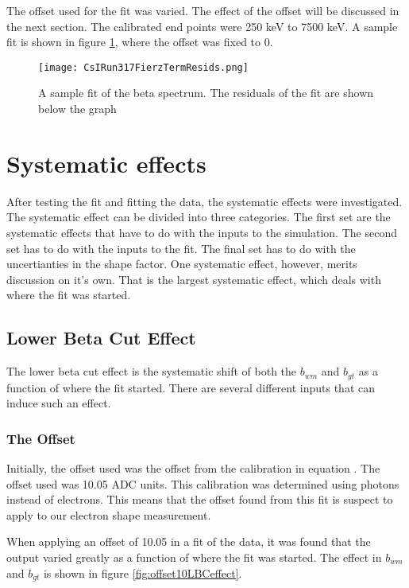 \documentclass[main.tex]{subfiles}
\begin{document}
The offset used for the fit was varied.
The effect of the offset will be discussed in the next section. 
The calibrated end points were 250 keV to 7500 keV. 
A sample fit is shown in figure \ref{fig:samplefit}, where the offset was fixed to 0.

\begin{figure}[!htb]
	\centerline{\texttt{[image: CsIRun317FierzTermResids.png]}}
	\caption{A sample fit of the beta spectrum. 
		 The residuals of the fit are shown below the graph}
	\label{fig:samplefit}
\end{figure}

\section{Systematic effects}

After testing the fit and fitting the data, the systematic effects were investigated.
The systematic effect can be divided into three categories.
The first set are the systematic effects that have to do with the inputs to the simulation.
The second set has to do with the inputs to the fit.
The final set has to do with the uncertianties in the shape factor. 
One systematic effect, however, merits discussion on it's own.
That is the largest systematic effect, which deals with where the fit was started.

\subsection{Lower Beta Cut Effect}

The lower beta cut effect is the systematic shift of both the $b_{wm}$ and $b_{gt}$ as a function of where the fit started.
There are several different inputs that can induce such an effect.

\subsubsection{The Offset}
Initially, the offset used was the offset from the calibration  in equation \label{eq:cal}.
The offset used was 10.05 ADC units.
This calibration was determined using photons instead of electrons.
This means that the offset found from this fit is suspect to apply to our electron shape measurement.

When applying an offset of 10.05 in a fit of the data, it was found that the output varied greatly as a function of where the fit was started.
The effect in $b_{wm}$ and $b_{gt}$ is shown in figure \ref{fig:offset10LBCeffect}.
\end{document}
